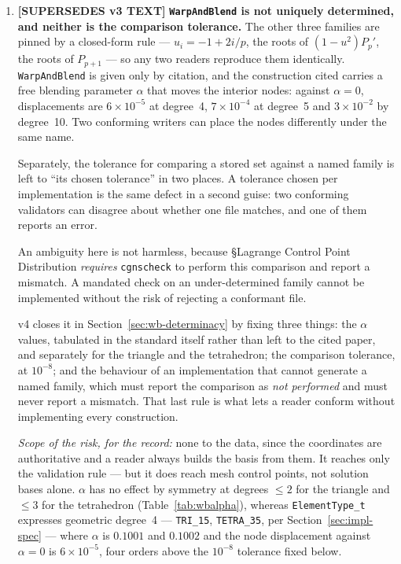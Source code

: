 \documentclass[11pt,letterpaper]{article}
\newif\ifvfourdraft
\newenvironment{v4block}{\ifvfourdraft\color{v4violet}\fi\ignorespaces}{\par}
\newcommand{\SUPERSEDESIV}{\ifvfourdraft
  \textcolor{v4violet}{\textbf{[SUPERSEDES v3 TEXT]}}\else
  \textcolor{clarifybrown}{\textbf{[SUPERSEDES v3 TEXT]}}\fi}
\begin{document}
{\begin{v4block}
\begin{enumerate}[leftmargin=1.4em,itemsep=0.5em]
  \item \SUPERSEDESIV{} \textbf{\texttt{WarpAndBlend} is not uniquely determined,
    and neither is the comparison tolerance.}
    The other three families are pinned by a closed-form rule --- $u_i = -1+2i/p$,
    the roots of $(1-u^2)P_p'$, the roots of $P_{p+1}$ --- so any two readers
    reproduce them identically.  \texttt{WarpAndBlend} is given only by citation,
    and the construction cited carries a free blending parameter $\alpha$ that
    moves the interior nodes: against $\alpha = 0$, displacements are
    $6\times10^{-5}$ at degree~4, $7\times10^{-4}$ at degree~5 and
    $3\times10^{-2}$ by degree~10.  Two conforming writers can place the nodes
    differently under the same name.

    Separately, the tolerance for comparing a stored set against a named family
    is left to ``its chosen tolerance'' in two places.  A tolerance chosen per
    implementation is the same defect in a second guise: two conforming
    validators can disagree about whether one file matches, and one of them
    reports an error.

    An ambiguity here is not harmless, because \S Lagrange Control Point
    Distribution \emph{requires} \texttt{cgnscheck} to perform this comparison
    and report a mismatch.  A mandated check on an under-determined family
    cannot be implemented without the risk of rejecting a conformant file.

    v4 closes it in Section~\ref{sec:wb-determinacy} by fixing three things: the
    $\alpha$ values, tabulated in the standard itself rather than left to the
    cited paper, and separately for the triangle and the tetrahedron; the
    comparison tolerance, at $10^{-8}$; and the behaviour of an implementation
    that cannot generate a named family, which must report the comparison as
    \emph{not performed} and must never report a mismatch.  That last rule is
    what lets a reader conform without implementing every construction.

    \textit{Scope of the risk, for the record:} none to the data, since the
    coordinates are authoritative and a reader always builds the basis from them.
    It reaches only the validation rule --- but it does reach mesh control points,
    not solution bases alone.  $\alpha$ has no effect by symmetry at degrees
    $\le 2$ for the triangle and $\le 3$ for the tetrahedron
    (Table~\ref{tab:wbalpha}), whereas \texttt{ElementType\_t} expresses geometric
    degree~4 --- \texttt{TRI\_15}, \texttt{TETRA\_35}, per
    Section~\ref{sec:impl-spec} --- where $\alpha$ is $0.1001$ and $0.1002$ and
    the node displacement against $\alpha = 0$ is $6\times10^{-5}$, four orders
    above the $10^{-8}$ tolerance fixed below.


\end{enumerate}
\end{v4block}}
\end{document}
